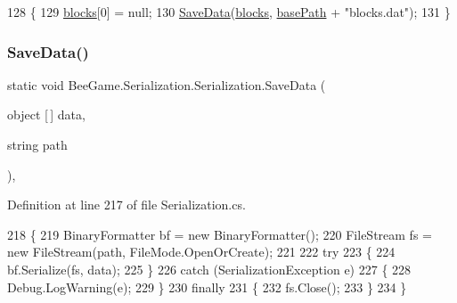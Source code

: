\begin{DoxyCode}
128         \{
129             \hyperlink{class_bee_game_1_1_serialization_1_1_serialization_a0b8dee0f221f22b34bb3de8c146b4d0d}{blocks}[0] = null;
130             \hyperlink{class_bee_game_1_1_serialization_1_1_serialization_a5e84293340234b478d4ef6bd8168260f}{SaveData}(\hyperlink{class_bee_game_1_1_serialization_1_1_serialization_a0b8dee0f221f22b34bb3de8c146b4d0d}{blocks}, \hyperlink{class_bee_game_1_1_serialization_1_1_serialization_ab90922fcf58a723ce591487507356310}{basePath} + \textcolor{stringliteral}{"blocks.dat"});
131         \}
\end{DoxyCode}
\mbox{\label{class_bee_game_1_1_serialization_1_1_serialization_a5e84293340234b478d4ef6bd8168260f}} 
\subsubsection{\texorpdfstring{Save\+Data()}{SaveData()}}
{\footnotesize\ttfamily static void Bee\+Game.\+Serialization.\+Serialization.\+Save\+Data (\begin{DoxyParamCaption}\item[{object \mbox{[}$\,$\mbox{]}}]{data,  }\item[{string}]{path }\end{DoxyParamCaption})\hspace{0.3cm}{\ttfamily [static]}, {\ttfamily [private]}}



Definition at line 217 of file Serialization.\+cs.


\begin{DoxyCode}
218         \{
219             BinaryFormatter bf = \textcolor{keyword}{new} BinaryFormatter();
220             FileStream fs = \textcolor{keyword}{new} FileStream(path, FileMode.OpenOrCreate);
221 
222             \textcolor{keywordflow}{try}
223             \{
224                 bf.Serialize(fs, data);
225             \}
226             \textcolor{keywordflow}{catch} (SerializationException e)
227             \{
228                 Debug.LogWarning(e);
229             \}
230             \textcolor{keywordflow}{finally}
231             \{
232                 fs.Close();
233             \}
234         \}
\end{DoxyCode}
\mbox{\label{class_bee_game_1_1_serialization_1_1_serialization_a6eef4285def16ce7c5ce67b487e03dd1}} 
